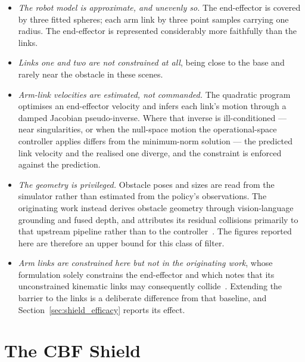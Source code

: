 \begin{itemize}
  \item \emph{The robot model is approximate, and unevenly so.} The end-effector is covered by
  three fitted spheres; each arm link by three point samples carrying one radius. The end-effector
  is represented considerably more faithfully than the links.

  \item \emph{Links one and two are not constrained at all}, being close to the base and rarely
  near the obstacle in these scenes.

  \item \emph{Arm-link velocities are estimated, not commanded.} The quadratic program optimises an
  end-effector velocity and infers each link's motion through a damped Jacobian pseudo-inverse.
  Where that inverse is ill-conditioned --- near singularities, or when the null-space motion the
  operational-space controller applies differs from the minimum-norm solution --- the predicted
  link velocity and the realised one diverge, and the constraint is enforced against the
  prediction.

  \item \emph{The geometry is privileged.} Obstacle poses and sizes are read from the simulator
  rather than estimated from the policy's observations. The originating work instead derives
  obstacle geometry through vision-language grounding and fused depth, and attributes its residual
  collisions primarily to that upstream pipeline rather than to the controller~\cite{vlsa2026}. The
  figures reported here are therefore an upper bound for this class of filter.

  \item \emph{Arm links are constrained here but not in the originating work}, whose formulation
  solely constrains the end-effector and which notes that its unconstrained kinematic links may
  consequently collide~\cite{vlsa2026}. Extending the barrier to the links is a deliberate
  difference from that baseline, and Section~\ref{sec:shield_efficacy} reports its effect.
\end{itemize}

\section{The CBF Shield}\label{sec:shield}

